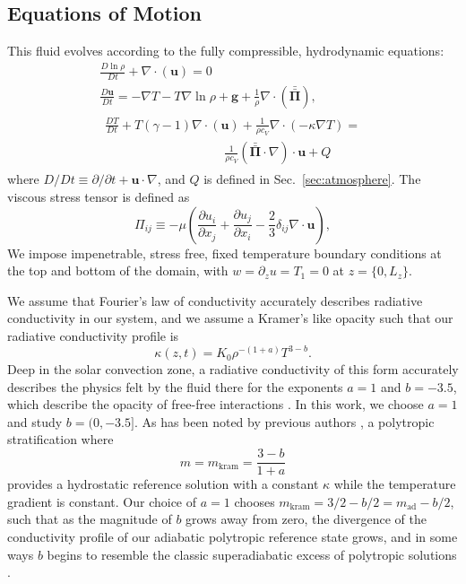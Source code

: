 \documentclass[twocolumn, amsmath, amsfonts, amssymb]{aastex62}
\newcommand{\Div}[1]{\ensuremath{\nabla\cdot\left( #1\right)}}
\newcommand{\grad}{\ensuremath{\nabla}}
\newcommand{\stressT}{\ensuremath{\bm{\bar{\bar{\Pi}}}}}
\begin{document}
\subsection{Equations of Motion}
This fluid evolves according to the fully
compressible, hydrodynamic equations:
\begin{gather}
\frac{D \ln\rho}{D t} + \Div{\bm{u}} = 0
	\label{eqn:density_equation}
\\
\frac{D \bm{u}}{D t}  =
-\grad T - T \grad\ln\rho + \bm{g} + \frac{1}{\rho}\Div{\stressT}, 
	\label{eqn:momentum_equation}
\\
\begin{gathered}
\frac{D T}{D t} + T(\gamma - 1)\Div{\bm{u}}
+ \frac{1}{\rho c_V}\Div{-\kappa \grad T} = \\
\hspace{4cm}\frac{1}{\rho c_V}(\stressT\cdot\grad)\cdot\bm{u} + Q
\end{gathered}
	\label{eqn:energy_equation}
\end{gather}
where $D/Dt \equiv \partial/\partial t + \bm{u}\cdot\grad$, and $Q$ is
defined in Sec.~\ref{sec:atmosphere}. The
viscous stress tensor is defined as 
\begin{equation}
\Pi_{ij} \equiv -\mu \left(\frac{\partial u_i}{\partial x_j} + 
\frac{\partial u_j}{\partial x_i} - \frac{2}{3}\delta_{ij}\grad\cdot\bm{u}\right),
	\label{eqn:stress_tensor}
\end{equation}
We impose impenetrable, stress free, fixed temperature boundary conditions at
the top and bottom of the domain, with 
$w = \partial_z u = T_1 = 0$ at $z = \{0, L_z\}$. 


We assume that Fourier's law of conductivity \citep{lecoanet&all2014} accurately
describes radiative conductivity in our system, and we assume a Kramer's like
opacity such that our radiative conductivity profile is 
\citep{barekat&brandenburg2014, kapyla&all2017, kapyla&all2018}
\begin{equation}
\kappa(z, t) = K_0 \rho^{-(1+a)}T^{3-b}.
\end{equation}
Deep in the solar convection zone, a radiative conductivity of this form accurately
describes the physics felt by the fluid there for the exponents $a = 1$ and
$b = -3.5$, which describe the opacity of free-free interactions 
\citep{Cox&Giuli}. In this work, we choose $a = 1$ and study $b = (0, -3.5]$.
As has been noted by previous authors \citep{jones1976, edwards1990, barekat&brandenburg2014},
a polytropic stratification where
$$
m = m_{\text{kram}} = \frac{3-b}{1 + a}
$$
provides a hydrostatic reference solution with a constant $\kappa$ while the
temperature gradient is constant. Our choice of $a = 1$ chooses
$m_{\text{kram}} = 3/2 - b/2  = m_{\text{ad}} - b/2$, such that as the magnitude
of $b$ grows away from zero, the divergence of the 
conductivity profile of our adiabatic polytropic reference state grows, and in
some ways $b$ begins to resemble the classic superadiabatic excess of polytropic
solutions \citep{graham1975, anders&brown2017}.
\end{document}
